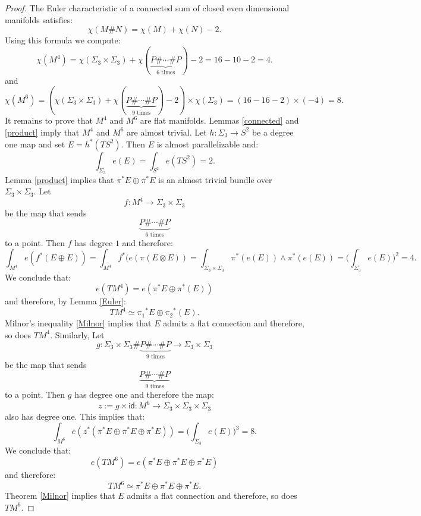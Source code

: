 \begin{proof}
	The Euler characteristic of a connected sum of closed even dimensional manifolds satisfies:
	\[ \chi( M \#N)=\chi(M)+ \chi(N)-2.\]
	Using this formula we compute:
	\[ \chi(M^4) =\chi(\Sigma_3 \times \Sigma_3)+\chi( \underbrace{ P\# \cdots \#P}_{6\text{ times}})-2=16-10-2=4.\]
	and
	\[ \chi(M^6) =(\chi(\Sigma_3 \times \Sigma_3)+\chi( \underbrace{ P\# \cdots \#P}_{9\text{ times}})-2)\times \chi(\Sigma_3)=(16-16-2)\times (-4)=8.\]
	It remains to prove that $M^4$ and $M^6$ are flat manifolds. Lemmas \ref{connected} and \ref{product} imply that $M^4$ and $M^6$ are almost trivial. Let $h: \Sigma_3 \rightarrow S^2$ be a degree one map and set $E=h^*(TS^2)$. Then $E$ is almost parallelizable and:
	\[ \int_{\Sigma_3}e(E)=\int_{S^2} e(TS^2)=2.\]
	Lemma \ref{product} implies that  ${\pi}^*E \oplus {\pi}^*E$ is an almost trivial bundle over $\Sigma_3 \times \Sigma_3.$ Let \[f: M^4 \rightarrow \Sigma_3 \times \Sigma_3\] be the map that
	sends \[\underbrace{ P\# \cdots \#P}_{6\text{ times}}\] to a point. Then $f$ has degree $1$ and therefore:
	\[ \int_{M^4} e(f^*(E \oplus E))= \int_{M^4} f^*(e(\pi(E \otimes E))=\int_{\Sigma_3 \times \Sigma_3} {\pi}^*(e(E))\wedge
	{\pi}^*(e(E))=\Big(\int_{\Sigma_3}e(E)\Big)^2=4.\]
	We conclude that:
	\[ e(TM^4)=e({\pi}^*E \oplus {\pi}^*(E))\]
	and therefore, by Lemma \ref{Euler}:
	\[ TM^4 \simeq {\pi_1}^*E \oplus {\pi_2}^*(E).\]
	Milnor's inequality \ref{Milnor} implies that $E$ admits a flat connection and therefore, so does $TM^4$.
	Similarly, Let \[g:\Sigma_3 \times \Sigma_3\# \underbrace{ P\# \cdots \#P}_{9\text{ times}}  \rightarrow \Sigma_3 \times \Sigma_3\] be the map that
	sends \[\underbrace{ P\# \cdots \#P}_{9\text{ times}}\] to a point. Then $g$ has degree one and therefore the map:
	\[ z:=g \times \mathsf{id}:M^6 \rightarrow \Sigma_3 \times \Sigma_3 \times \Sigma_3\]
	also has degree one. This implies that:
	\[ \int_{M^6} e(z^*({\pi}^*E \oplus {\pi}^*E\oplus {\pi}^*E))= \Big(\int_{\Sigma_3} e(E) \Big)^3=8.\]
	We conclude that:
	\[ e(TM^6)=e({\pi}^*E \oplus {\pi}^*E \oplus {\pi}^*E)\]
	and therefore:
	\[ TM^6 \simeq {\pi}^*E \oplus {\pi}^*E \oplus {\pi}^*E .\]
	Theorem \ref{Milnor} implies that $E$ admits a flat connection and therefore, so does $TM^6$.
	
\end{proof}